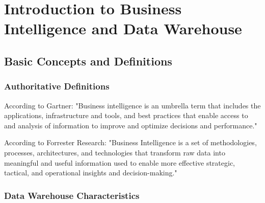 \chapter{Introduction to Business Intelligence and Data Warehouse}

\section{Basic Concepts and Definitions}

\subsection{Authoritative Definitions}
According to Gartner: "Business intelligence is an umbrella term that includes the applications, infrastructure and tools, and best practices that enable access to and analysis of information to improve and optimize decisions and performance."

According to Forrester Research: "Business Intelligence is a set of methodologies, processes, architectures, and technologies that transform raw data into meaningful and useful information used to enable more effective strategic, tactical, and operational insights and decision-making."

\subsection{Data Warehouse Characteristics}

